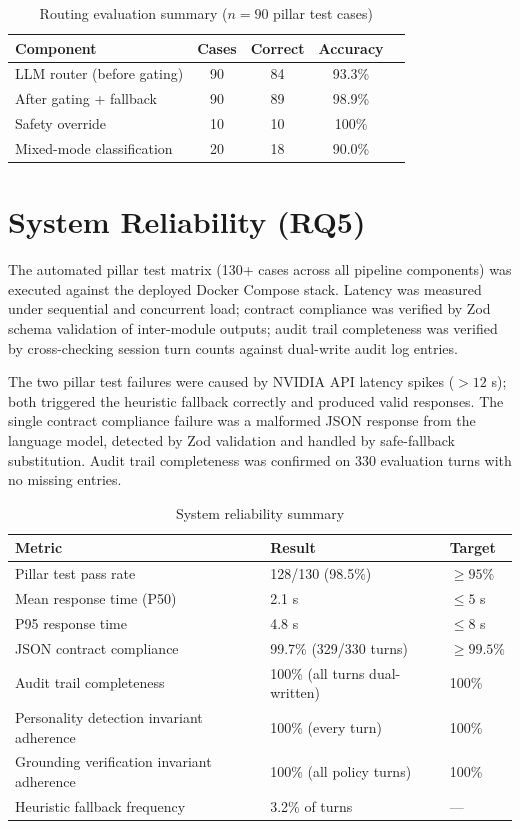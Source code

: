 \documentclass[10pt,a4paper]{report}
\begin{document}
\begin{table}[H]
\centering\small
\caption{Routing evaluation summary ($n = 90$ pillar test cases)}
\begin{tabular}{@{}lcccc@{}}
\toprule
Component & Cases & Correct & Accuracy \\
\midrule
LLM router (before gating) & 90 & 84 & 93.3\% \\
After gating + fallback & 90 & 89 & 98.9\% \\
Safety override & 10 & 10 & 100\% \\
Mixed-mode classification & 20 & 18 & 90.0\% \\
\bottomrule
\end{tabular}
\end{table}

\section{System Reliability (RQ5)}

The automated pillar test matrix (130+ cases across all pipeline components) was executed against the deployed Docker Compose stack. Latency was measured under sequential and concurrent load; contract compliance was verified by Zod schema validation of inter-module outputs; audit trail completeness was verified by cross-checking session turn counts against dual-write audit log entries.

The two pillar test failures were caused by NVIDIA API latency spikes ($> 12$ s); both triggered the heuristic fallback correctly and produced valid responses. The single contract compliance failure was a malformed JSON response from the language model, detected by Zod validation and handled by safe-fallback substitution. Audit trail completeness was confirmed on 330 evaluation turns with no missing entries.

\begin{table}[H]
\centering\small
\caption{System reliability summary}
\begin{tabularx}{\textwidth}{@{}lXX@{}}
\toprule
Metric & Result & Target \\
\midrule
Pillar test pass rate & 128/130 (98.5\%) & $\geq 95\%$ \\
Mean response time (P50) & 2.1 s & $\leq 5$ s \\
P95 response time & 4.8 s & $\leq 8$ s \\
JSON contract compliance & 99.7\% (329/330 turns) & $\geq 99.5\%$ \\
Audit trail completeness & 100\% (all turns dual-written) & 100\% \\
Personality detection invariant adherence & 100\% (every turn) & 100\% \\
Grounding verification invariant adherence & 100\% (all policy turns) & 100\% \\
Heuristic fallback frequency & 3.2\% of turns & --- \\
\bottomrule
\end{tabularx}
\end{table}
\end{document}
